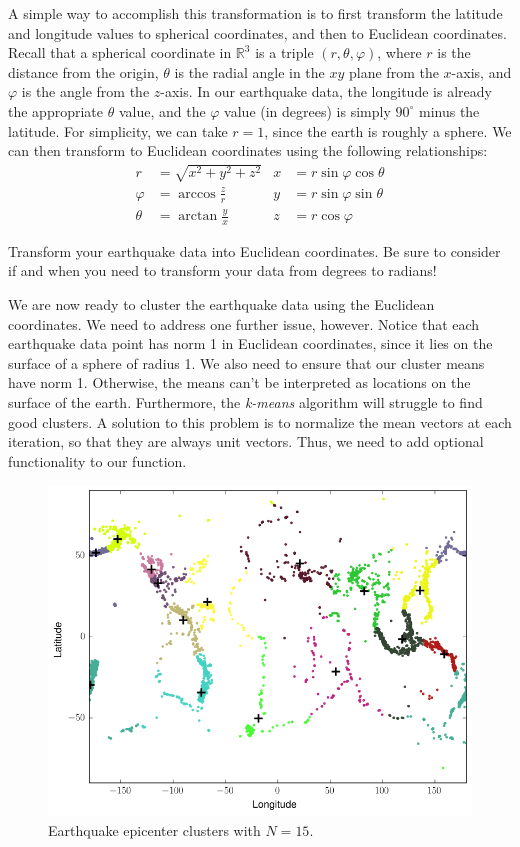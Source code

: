 A simple way to accomplish this transformation is to first transform the latitude and longitude values to spherical coordinates, and then to Euclidean coordinates.
Recall that a spherical coordinate in $\mathbb{R}^3$ is a triple $(r,\theta,\varphi)$, where $r$ is the distance from the origin, $\theta$ is the radial angle in the $xy$ plane from the $x$-axis,
and $\varphi$ is the angle from the $z$-axis. In our earthquake data, the longitude is already the appropriate $\theta$ value, and the $\varphi$ value (in degrees) is simply $90^\circ$ minus the latitude.
For simplicity, we can take $r=1$, since the earth is roughly a sphere.
We can then transform to Euclidean coordinates using the following relationships:
\begin{align*}
r & = \sqrt{x^{2} + y^{2} + z^{2}} & x & = r \sin \varphi \cos \theta \\
\varphi & = \arccos \frac{z}{r} & y & = r \sin \varphi \sin \theta \\
\theta & = \arctan \frac{y}{x} & z & = r \cos \varphi
\end{align*}

\begin{problem}
Transform your earthquake data into Euclidean coordinates.
Be sure to consider if and when you need to transform your data from degrees to radians!
\end{problem}

We are now ready to cluster the earthquake data using the Euclidean coordinates.
We need to address one further issue, however.
Notice that each earthquake data point has norm 1 in Euclidean coordinates, since it lies on the surface of a sphere of radius 1.
We also need to ensure that our cluster means have norm 1.
Otherwise, the means can't be interpreted as locations on the surface of the earth.
Furthermore, the \emph{k-means} algorithm will struggle to find good clusters.
A solution to this problem is to normalize the mean vectors at each iteration, so that they are always unit vectors.
Thus, we need to add optional functionality to our  function.
\begin{figure}
	\centering
	\includegraphics[width=\textwidth]{earthquake_clusters.png}
	\caption{Earthquake epicenter clusters with $N = 15$.}
	\label{fig:earthquakeclusters}
\end{figure}

